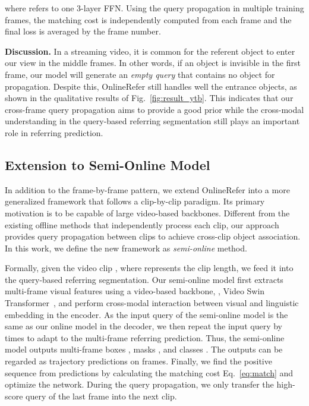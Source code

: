 \documentclass[10pt,twocolumn,letterpaper]{article}
\begin{document}
where  refers to one 3-layer FFN.
Using the query propagation in multiple training frames, the matching cost is independently computed from each frame and the final loss is averaged by the frame number.


\noindent\textbf{Discussion.} 
In a streaming video, it is common for the referent object to enter our view in the middle frames.
In other words, if an object is invisible in the first frame, our model will generate an \textit{empty query} that contains no object for propagation.
Despite this, OnlineRefer still handles well the entrance objects, as shown in the qualitative results of Fig.~\ref{fig:result_ytb}.
This indicates that our cross-frame query propagation aims to provide a good prior while the cross-modal understanding in the query-based referring segmentation still plays an important role in referring prediction.



\subsection{Extension to Semi-Online Model}
\label{sec:extension}

In addition to the frame-by-frame pattern,  we extend OnlineRefer into a more generalized framework that follows a clip-by-clip paradigm.
Its primary motivation is to be capable of large video-based backbones. 
Different from the existing offline methods that independently process each clip, our approach provides query propagation between clips to achieve cross-clip object association.
In this work, we define the new framework as \textit{semi-online} method.


Formally, given the  video clip , where  represents the clip length, we feed it into the query-based referring segmentation. 
Our semi-online model first extracts multi-frame visual features using a video-based backbone, \ie, Video Swin Transformer~\cite{videoswin}, and perform cross-modal interaction between visual and linguistic embedding in the encoder.
As the input query of the semi-online model is the same as our online model in the decoder, we then repeat the input query by  times to adapt to the multi-frame referring prediction.
Thus, the semi-online model outputs  multi-frame boxes ,  masks , and classes .
The outputs can be regarded as  trajectory predictions on  frames.
Finally, we find the positive sequence from  predictions by calculating the matching cost Eq.~\ref{eq:match} and optimize the network.
During the query propagation, we only transfer the high-score query of the last frame into the next clip.
\end{document}
